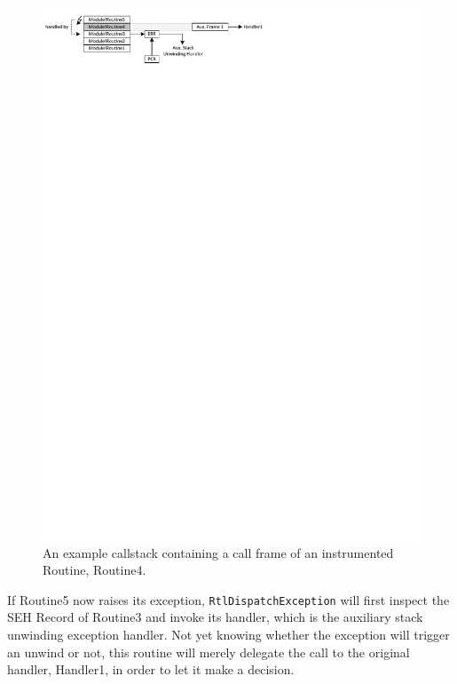 \begin{figure}[htbp] 
\begin{centering} 
\includegraphics[scale=1.2, clip=true, viewport=0cm 26cm 17cm 30cm]{images/diagrams/ExceptionSimpleWithInstr.pdf} 
\caption[An example callstack containing a call frame of an instrumented Routine]{An example callstack containing a call frame of an instrumented Routine, Routine4.} 
\label{ExceptionSimpleWithInstr} 
\end{centering} 
\end{figure}

If Routine5 now raises its exception, \verb|RtlDispatchException| will first inspect
the SEH Record of Routine3 and invoke its handler, which is the auxiliary stack unwinding exception 
handler. Not yet knowing whether the exception will trigger an unwind or not, this routine will 
merely delegate the call to the original handler, Handler1, in order to let it make a decision.

